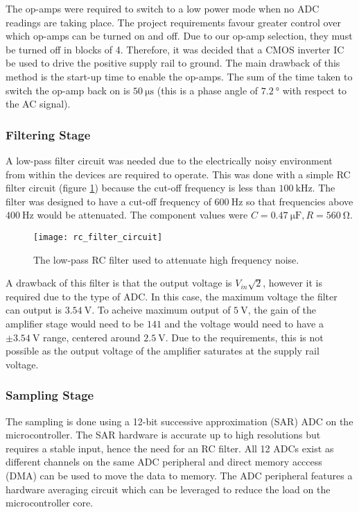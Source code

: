 The op-amps were required to switch to a low power mode when no ADC readings are taking place.
The project requirements favour greater control over which op-amps can be turned on and off.
Due to our op-amp selection, they must be turned off in blocks of 4.
Therefore, it was decided that a CMOS inverter IC be used to drive the positive supply rail to ground.
The main drawback of this method is the start-up time to enable the op-amps.
The sum of the time taken to switch the op-amp back on is $\SI{50}{\micro\second}$ (this is a phase angle of $\SI{7.2}{\degree}$ with respect to the AC signal).

\subsubsection{Filtering Stage}

A low-pass filter circuit was needed due to the electrically noisy environment from within the devices are required to operate.
This was done with a simple RC filter circuit (figure \ref{fig:filter}) because the cut-off frequency is less than $\SI{100}{\kilo\hertz}$.
The filter was designed to have a cut-off frequency of $\SI{600}{\hertz}$ so that frequencies above $\SI{400}{\hertz}$ would be attenuated.
The component values were $C = \SI{0.47}{\micro\farad}, R = \SI{560}{\ohm}$.
\begin{figure}[H]
	\centering
	\texttt{[image: rc\_filter\_circuit]}
	\caption{The low-pass RC filter used to attenuate high frequency noise.}
	\label{fig:filter}
\end{figure}

A drawback of this filter is that the output voltage is $V_{in} \sqrt{2}$, however it is required due to the type of ADC.
In this case, the maximum voltage the filter can output is $\SI{3.54}{\volt}$.
To acheive maximum output of $\SI{5}{\volt}$, the gain of the amplifier stage would need to be $141$ and the voltage would need to have a $\pm\SI{3.54}{\volt}$ range, centered around $\SI{2.5}{\volt}$.
Due to the requirements, this is not possible as the output voltage of the amplifier saturates at the supply rail voltage.

\subsubsection{Sampling Stage}

The sampling is done using a 12-bit successive approximation (SAR) ADC on the microcontroller.
The SAR hardware is accurate up to high resolutions but requires a stable input, hence the need for an RC filter.
All 12 ADCs exist as different channels on the same ADC peripheral and direct memory acccess (DMA) can be used to move the data to memory.
The ADC peripheral features a hardware averaging circuit which can be leveraged to reduce the load on the microcontroller core.


